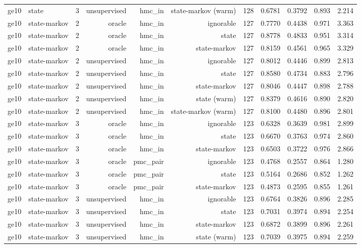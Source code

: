 \begin{table}[ht]
\begin{tabular}{llrrrrrrrrr}
ge10 & state & 3 & unsupervised & hmc\_in & state-markov (warm) & 128 & 0.6781 & 0.3792 & 0.893 & 2.214 \\
ge10 & state-markov & 2 & oracle & hmc\_in & ignorable & 127 & 0.7770 & 0.4438 & 0.971 & 3.363 \\
ge10 & state-markov & 2 & oracle & hmc\_in & state & 127 & 0.8778 & 0.4833 & 0.951 & 3.314 \\
ge10 & state-markov & 2 & oracle & hmc\_in & state-markov & 127 & 0.8159 & 0.4561 & 0.965 & 3.329 \\
ge10 & state-markov & 2 & unsupervised & hmc\_in & ignorable & 127 & 0.8012 & 0.4446 & 0.899 & 2.813 \\
ge10 & state-markov & 2 & unsupervised & hmc\_in & state & 127 & 0.8580 & 0.4734 & 0.883 & 2.796 \\
ge10 & state-markov & 2 & unsupervised & hmc\_in & state-markov & 127 & 0.8046 & 0.4447 & 0.898 & 2.788 \\
ge10 & state-markov & 2 & unsupervised & hmc\_in & state (warm) & 127 & 0.8379 & 0.4616 & 0.890 & 2.820 \\
ge10 & state-markov & 2 & unsupervised & hmc\_in & state-markov (warm) & 127 & 0.8100 & 0.4480 & 0.896 & 2.801 \\
ge10 & state-markov & 3 & oracle & hmc\_in & ignorable & 123 & 0.6328 & 0.3639 & 0.981 & 2.899 \\
ge10 & state-markov & 3 & oracle & hmc\_in & state & 123 & 0.6670 & 0.3763 & 0.974 & 2.860 \\
ge10 & state-markov & 3 & oracle & hmc\_in & state-markov & 123 & 0.6503 & 0.3722 & 0.976 & 2.866 \\
ge10 & state-markov & 3 & oracle & pmc\_pair & ignorable & 123 & 0.4768 & 0.2557 & 0.864 & 1.280 \\
ge10 & state-markov & 3 & oracle & pmc\_pair & state & 123 & 0.5164 & 0.2686 & 0.852 & 1.262 \\
ge10 & state-markov & 3 & oracle & pmc\_pair & state-markov & 123 & 0.4873 & 0.2595 & 0.855 & 1.261 \\
ge10 & state-markov & 3 & unsupervised & hmc\_in & ignorable & 123 & 0.6764 & 0.3826 & 0.896 & 2.285 \\
ge10 & state-markov & 3 & unsupervised & hmc\_in & state & 123 & 0.7031 & 0.3974 & 0.894 & 2.254 \\
ge10 & state-markov & 3 & unsupervised & hmc\_in & state-markov & 123 & 0.6872 & 0.3899 & 0.896 & 2.261 \\
ge10 & state-markov & 3 & unsupervised & hmc\_in & state (warm) & 123 & 0.7039 & 0.3975 & 0.894 & 2.259 \\

\end{tabular}
\end{table}
